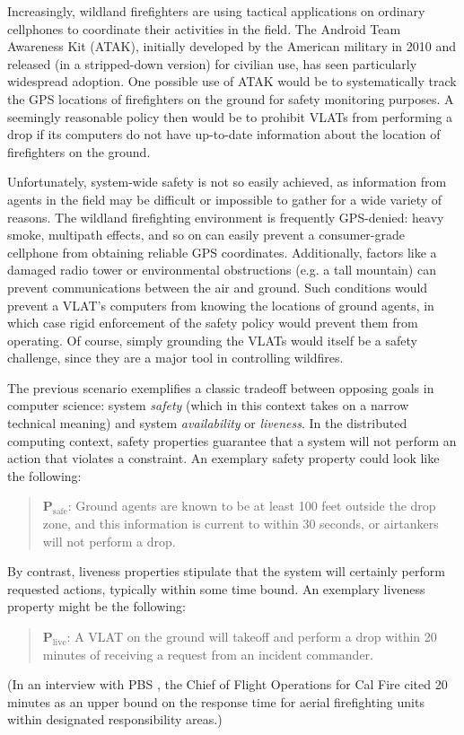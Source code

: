 \documentclass[]             %
{NASA}                       %
\theoremstyle{definition}
\begin{document}
Increasingly, wildland firefighters are using tactical applications on
ordinary cellphones to coordinate their activities in the field. The Android Team Awareness Kit (ATAK), initially developed by the American military in 2010 and released (in a stripped-down version) for civilian use, has seen particularly widespread adoption. One possible use of ATAK would be to systematically track the GPS locations of firefighters on the ground for safety monitoring purposes. A seemingly reasonable policy then would be to prohibit VLATs from performing a drop if its computers do not have up-to-date information about the location of firefighters on the ground.

Unfortunately, system-wide safety is not so easily achieved, as information from agents in the field may be
difficult or impossible to gather for a wide variety of reasons. The wildland firefighting environment is frequently GPS-denied: heavy smoke, multipath effects, and so on can easily prevent a consumer-grade cellphone from obtaining reliable GPS coordinates. Additionally, factors like a damaged radio tower or environmental obstructions (e.g. a tall mountain) can prevent communications between the air and
ground. Such conditions would prevent a VLAT's computers from knowing the locations of ground agents, in which case rigid enforcement of the safety policy would prevent them from operating. Of course, simply grounding the VLATs would itself be a safety challenge, since they are a major tool in controlling wildfires.

The previous scenario exemplifies a classic tradeoff between opposing goals in computer science:
system \emph{safety} (which in this context takes on a narrow technical meaning) and system \emph{availability} or \emph{liveness}. In
the distributed computing context, safety properties guarantee that a
system will not perform an action that violates a constraint. An
exemplary safety property could look like the following:
\begin{quote}
  $\textbf{P}_\textrm{safe}$: Ground agents are known to be at least
  100 feet outside the drop zone, and this information is current to
  within 30 seconds, or airtankers will not perform a drop.
\end{quote}
By contrast, liveness properties stipulate that the system will
certainly perform requested actions, typically within some time
bound. An exemplary liveness property might be the following:
\begin{quote}
  $\textbf{P}_\textrm{live}$: A VLAT on the ground will takeoff and
  perform a drop within 20 minutes of receiving a request from an
  incident commander.
\end{quote}
(In an interview with PBS \cite{2021:aerialfirefighting}, the Chief of Flight Operations for Cal Fire cited 20
	minutes as an upper bound on the response time for aerial firefighting units
	within designated responsibility areas.)
\end{document}
